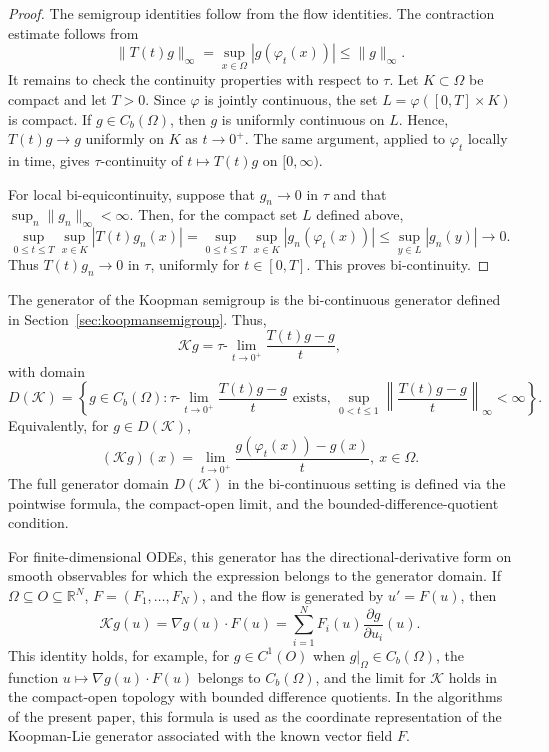 \documentclass[preprint,1p,times,nopreprintline]{elsarticle}
\begin{document}
\begin{proof}
The semigroup identities follow from the flow identities. The contraction estimate follows from
\[
\|T(t)g\|_\infty
=
\sup_{x\in\Omega}|g(\varphi_t(x))|
\le
\|g\|_\infty .
\]
It remains to check the continuity properties with respect to $\tau$. Let $K\subset\Omega$ be compact and let $T>0$. Since $\varphi$ is jointly continuous, the set $L=\varphi([0,T]\times K)$ is compact. If $g\in C_b(\Omega)$, then $g$ is uniformly continuous on $L$. Hence, $T(t)g\to g$ uniformly on $K$ as $t\to 0^+$. The same argument, applied to $\varphi_t$ locally in time, gives $\tau$-continuity of $t\mapsto T(t)g$ on $[0,\infty)$.

For local bi-equicontinuity, suppose that $g_n\to 0$ in $\tau$ and that $\sup_n\|g_n\|_\infty<\infty$. Then, for the compact set $L$ defined above,
\[
\sup_{0\le t\le T}\sup_{x\in K}|T(t)g_n(x)|
=
\sup_{0\le t\le T}\sup_{x\in K}|g_n(\varphi_t(x))|
\le
\sup_{y\in L}|g_n(y)|
\to 0.
\]
Thus $T(t)g_n\to 0$ in $\tau$, uniformly for $t\in[0,T]$. This proves bi-continuity.
\end{proof}

The generator of the Koopman semigroup is the bi-continuous generator defined
in Section~\ref{sec:koopmansemigroup}. Thus,
\[
\mathcal{K}g
=
\tau\text{-}\lim_{t\to 0^+}\frac{T(t)g-g}{t},
\]
with domain
\[
D(\mathcal{K})
=
\left\{
g\in C_b(\Omega):
\tau\text{-}\lim_{t\to 0^+}
\frac{T(t)g-g}{t}
\text{ exists, }
\sup_{0<t\le 1}
\left\|
\frac{T(t)g-g}{t}
\right\|_\infty
<\infty
\right\}.
\]
Equivalently, for $g\in D(\mathcal{K})$,
\[
(\mathcal{K}g)(x)
=
\lim_{t\to 0^+}
\frac{g(\varphi_t(x))-g(x)}{t},
~
x\in\Omega.
\]
The full generator domain $D(\mathcal{K})$ in the bi-continuous setting is defined via the pointwise formula, the compact-open limit, and the bounded-difference-quotient condition.

For finite-dimensional ODEs, this generator has the directional-derivative form on smooth observables for which the expression belongs to the generator domain. If $\Omega\subseteq O\subseteq\mathbb{R}^N$, $F=(F_1,\ldots,F_N)$, and the flow is generated by $u'=F(u)$, then
\[
\mathcal{K}g(u)
=
\nabla g(u)\cdot F(u)
=
\sum_{i=1}^N F_i(u)\frac{\partial g}{\partial u_i}(u).
\]
This identity holds, for example, for $g\in C^1(O)$ when $g|_\Omega\in C_b(\Omega)$, the function $u\mapsto \nabla g(u)\cdot F(u)$ belongs to $C_b(\Omega)$, and the limit for $\mathcal{K}$ holds in the compact-open topology with bounded difference quotients. In the algorithms of the present paper, this formula is used as the coordinate representation of the Koopman-Lie generator associated with the known vector field $F$.
\end{document}
